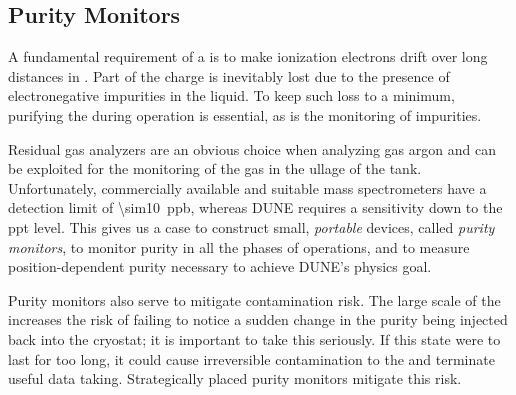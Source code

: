 \subsection{Purity Monitors} 
\label{sec:fdgen-slow-cryo-purity-mon}
\label{sec:fdsp-slow-cryo-purity-mon} %
\label{sec:fddp-slow-cryo-purity-mon} %
A fundamental requirement of a   is to make ionization electrons drift over long distances in . Part of the charge is inevitably lost due to the presence of electronegative impurities in the liquid. To keep such loss to a minimum, purifying the  during operation is essential, as is the monitoring of impurities.

Residual gas analyzers are an obvious choice when analyzing gas argon and can be exploited for the monitoring of the gas in the ullage of the tank. Unfortunately, commercially available and suitable mass spectrometers have a detection limit of \SI{\sim10}{ppb}, whereas DUNE requires a sensitivity down to the \si{ppt} level. This gives us a case to construct small, \textit{portable} devices, called \textit{purity monitors}, to monitor purity in all the phases of operations, and to measure position-dependent purity necessary to achieve DUNE's physics goal. 

Purity monitors also serve to mitigate \lar contamination risk.  %
The large scale of the  increases the risk of failing to notice a sudden change in the  \lar purity being injected back into the cryostat; it is important to take this seriously.  
If this state were to last %
for too long, it could cause irreversible contamination to the  and terminate useful data taking.  Strategically placed purity monitors mitigate this risk. 

